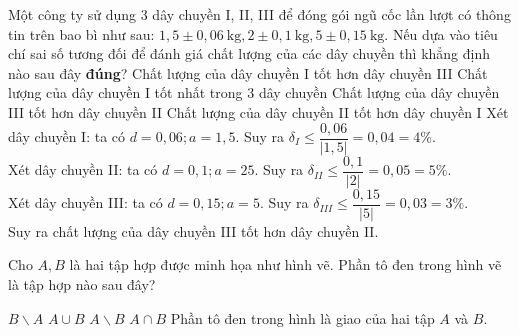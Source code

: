 \begin{ex}%
Một công ty sử dụng 3 dây chuyền I, II, III để đóng gói ngũ cốc lần lượt có thông tin trên bao bì như sau: $1{,}5 \pm 0{,}06 \mathrm{~kg}, 2 \pm 0{,}1 \mathrm{~kg}, 5 \pm 0{,}15 \mathrm{~kg}$. Nếu dựa vào tiêu chí sai số tương đối để đánh giá chất lượng của các dây chuyền thì khẳng định nào sau đây \textbf{đúng}?
	\choice
	{Chất lượng của dây chuyền I tốt hơn dây chuyền III}
	{Chất lượng của dây chuyền I tốt nhất trong 3 dây chuyền}
	{\True Chất lượng của dây chuyền III tốt hơn dây chuyền II}
	{Chất lượng của dây chuyền II tốt hơn dây chuyền I}
	\loigiai
	{
		Xét dây chuyền I: ta có $d=0{,}06; a=1{,}5$. Suy ra 
		$\delta _I \le \dfrac{0{,}06}{{\left| 1{,}5 \right|}} = 0{,}04 = 4\% $.\\
		Xét dây chuyền II: ta có $d=0{,}1; a=25$.  Suy ra
		$\delta _{II} \le \dfrac{0{,}1}{{\left| 2 \right|}} = 0{,}05 = 5\% $.\\
		Xét dây chuyền III: ta có $d=0{,}15; a=5$. Suy ra
		$\delta _{III} \le \dfrac{0{,}15}{{\left|5 \right|}} = 0{,}03 = 3\% $.\\
		Suy ra chất lượng của dây chuyền III tốt hơn dây chuyền II.
	}
\end{ex}
\begin{ex}%
	Cho $A, B$ là hai tập hợp được minh họa như hình vẽ. Phần tô đen trong hình vẽ là tập hợp nào sau đây?
	\begin{center}
		\def\firstcircle{(0,0) circle (1.5cm)}
		\def\secondcircle{(10:2cm) circle (1.5cm)}
	\end{center}
	\choice
	{$B \backslash A$}
	{$A \cup B$}
	{$A \backslash B$}
	{\True $A \cap B$}
	\loigiai
	{
		Phần tô đen trong hình là giao của hai tập $A$ và $B$.
	}
\end{ex}
